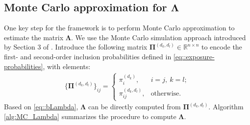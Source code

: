 \documentclass[twoside,letterpaper]{article}
\theoremstyle{plain}
\theoremstyle{definition}
\theoremstyle{remark}
\newcommand{\bLambda}{\boldsymbol{\Lambda}}
\newcommand{\bPi}{\boldsymbol{\Pi}}
\begin{document}
\subsection{Monte Carlo approximation for $\bLambda$}\label{sec:mc_lambda}
One key step for the framework is to perform Monte Carlo approximation to estimate the matrix $\bLambda$. We use the Monte Carlo simulation approach introduced by Section 3 of \citet{aronow2017estimating}. Introduce the following matrix $\bPi^{(d_k,d_l)}\in\mathbb{R}^{n\times n}$ to encode the first- and second-order inclusion probabilities defined in \eqref{eq::exposure-probabilities}, with elements:
\begin{align}
    \{\bPi^{(d_k, d_l)}\}_{ij} =
    \left\{
        \begin{array}{ll}
            \pi_i^{(d_k)}, & i=j,~ k=l;\\
            \pi_{ij}^{(d_k, d_l)}, & \text{otherwise}.
        \end{array}
    \right.
\end{align}
Based on \eqref{eq::bLambda}, $\bLambda$ can be directly computed from $\bPi^{(d_k, d_l)}$. Algorithm \ref{alg:MC_Lambda} summarizes the procedure to compute $\bLambda$. 
\end{document}

